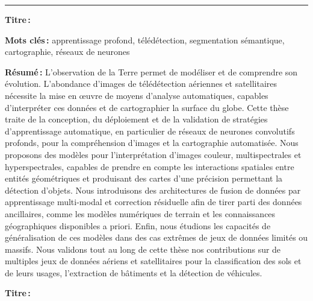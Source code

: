 {\begin{titlepage}
\begin{minipage}{0.2\textwidth}
\end{minipage}
\vspace*{2.3cm}

{\color{rulepink}\rule{\textwidth}{0.2cm}}

\bigskip

\begin{minipage}{\textwidth}
\large{}\selectfont
{\color{textpink} \textbf{Titre\,:}}~~\@title

\bigskip

\textbf{Mots clés\,:} apprentissage profond, télédétection, segmentation sémantique, cartographie, réseaux de neurones
\begin{multicols}{2}
\textbf{Résumé\,:}
L'observation de la Terre permet de modéliser et de comprendre son évolution. L'abondance d'images de télédétection aériennes et satellitaires nécessite la mise en œuvre de moyens d'analyse automatiques, capables d'interpréter ces données et de cartographier la surface du globe. Cette thèse traite de la conception, du déploiement et de la validation de stratégies d'apprentissage automatique, en particulier de réseaux de neurones convolutifs profonds, pour la compréhension d'images et la cartographie automatisée. Nous proposons des modèles pour l'interprétation d'images couleur, multispectrales et hyperspectrales, capables de prendre en compte les interactions spatiales entre entités géométriques et produisant des cartes d'une précision permettant la détection d'objets. Nous introduisons des architectures de fusion de données par apprentissage multi-modal et correction résiduelle afin de tirer parti des données ancillaires, comme les modèles numériques de terrain et les connaissances géographiques disponibles a priori. Enfin, nous étudions les capacités de généralisation de ces modèles dans des cas extrêmes de jeux de données limités ou massifs. Nous validons tout au long de cette thèse nos contributions sur de multiples jeux de données aériens et satellitaires pour la classification des sols et de leurs usages, l'extraction de bâtiments et la détection de véhicules.

\end{multicols}
\end{minipage}
\vspace{4em}

\bigskip

\begin{minipage}{\textwidth}
\large{}\selectfont
{\color{textpink} \textbf{Titre\,:}}~~\@titleen


\end{minipage}
\end{titlepage}}
